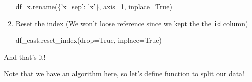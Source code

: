 \documentclass[11pt]{article}
\newenvironment{Shaded}{}{}
\newcommand{\DecValTok}[1]{\textcolor[rgb]{0.25,0.63,0.44}{{#1}}}
\newcommand{\StringTok}[1]{\textcolor[rgb]{0.25,0.44,0.63}{{#1}}}
\newcommand{\NormalTok}[1]{{#1}}
\newcommand{\VariableTok}[1]{\textcolor[rgb]{0.10,0.09,0.49}{{#1}}}
\newcommand{\OperatorTok}[1]{\textcolor[rgb]{0.40,0.40,0.40}{{#1}}}
\begin{document}
\begin{enumerate}
\begin{Shaded}
\begin{Highlighting}[]
\NormalTok{    df_x.rename(\{}\StringTok{'x_sep'}\NormalTok{: }\StringTok{'x'}\NormalTok{\}, axis}\OperatorTok{=}\DecValTok{1}\NormalTok{, inplace}\OperatorTok{=}\VariableTok{True}\NormalTok{)}
\end{Highlighting}
\end{Shaded}
\item
  Reset the index (We won't loose reference since we kept the the
  \texttt{id} column)

\begin{Shaded}
\begin{Highlighting}[]
\NormalTok{    df_cast.reset_index(drop}\OperatorTok{=}\VariableTok{True}\NormalTok{, inplace}\OperatorTok{=}\VariableTok{True}\NormalTok{)}
\end{Highlighting}
\end{Shaded}
\end{enumerate}

And that's it!

Note that we have an algorithm here, so let's define function to split
our data!
\end{document}
